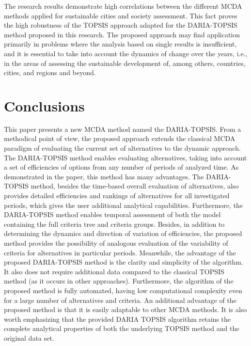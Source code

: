\documentclass[5p,times]{elsarticle}
\begin{document}
The research results demonstrate high correlations between the different MCDA methods applied for sustainable cities and society assessment. This fact proves the high robustness of the TOPSIS approach adapted for the DARIA-TOPSIS method proposed in this research. The proposed approach may find application primarily in problems where the analysis based on single results is insufficient, and it is essential to take into account the dynamics of change over the years, i.e., in the areas of assessing the sustainable development of, among others, countries, cities, and regions and beyond.

\section{Conclusions}
\label{sec:concl}

This paper presents a new MCDA method named the DARIA-TOPSIS. From a methodical point of view, the proposed approach extends the classical MCDA paradigm of evaluating the current set of alternatives to the dynamic approach. The DARIA-TOPSIS method enables evaluating alternatives, taking into account a set of efficiencies of options from any number of periods of analyzed time. As demonstrated in the paper, this method has many advantages. The DARIA-TOPSIS method, besides the time-based overall evaluation of alternatives, also provides detailed efficiencies and rankings of alternatives for all investigated periods, which gives the user additional analytical capabilities. Furthermore, the DARIA-TOPSIS method enables temporal assessment of both the model containing the full criteria tree and criteria groups. Besides, in addition to determining the dynamics and direction of variation of efficiencies, the proposed method provides the possibility of analogous evaluation of the variability of criteria for alternatives in particular periods. Meanwhile, the advantage of the proposed DARIA-TOPSIS method is the clarity and simplicity of the algorithm. It also does not require additional data compared to the classical TOPSIS method (as it occurs in other approaches). Furthermore, the algorithm of the proposed method is fully automated, having low computational complexity even for a large number of alternatives and criteria. An additional advantage of the proposed method is that it is easily adaptable to other MCDA methods. It is also worth emphasizing that the provided DARIA TOPSIS algorithm retains the complete analytical properties of both the underlying TOPSIS method and the original data set.
\end{document}
